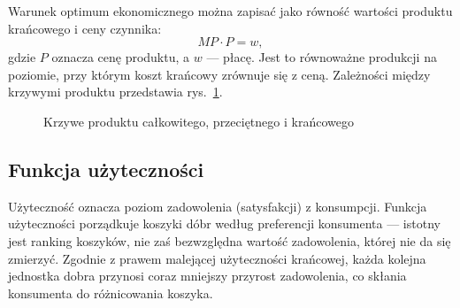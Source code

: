 Warunek optimum ekonomicznego można zapisać jako równość wartości produktu krańcowego i ceny czynnika:
\begin{equation}
MP\cdot P = w,
\end{equation}
gdzie $P$ oznacza cenę produktu, a $w$ --- płacę. Jest to równoważne produkcji na poziomie, przy którym koszt krańcowy zrównuje się z ceną. Zależności między krzywymi produktu przedstawia rys.~\ref{fig:tpapmp}.

\begin{figure}[h]
\centering
{}
\caption{Krzywe produktu całkowitego, przeciętnego i krańcowego}
\label{fig:tpapmp}
\zrodlo
\end{figure}

\subsection{Funkcja użyteczności}

Użyteczność oznacza poziom zadowolenia (satysfakcji) z konsumpcji. Funkcja użyteczności porządkuje koszyki dóbr według preferencji konsumenta --- istotny jest ranking koszyków, nie zaś bezwzględna wartość zadowolenia, której nie da się zmierzyć. Zgodnie z prawem malejącej użyteczności krańcowej, każda kolejna jednostka dobra przynosi coraz mniejszy przyrost zadowolenia, co skłania konsumenta do różnicowania koszyka.

